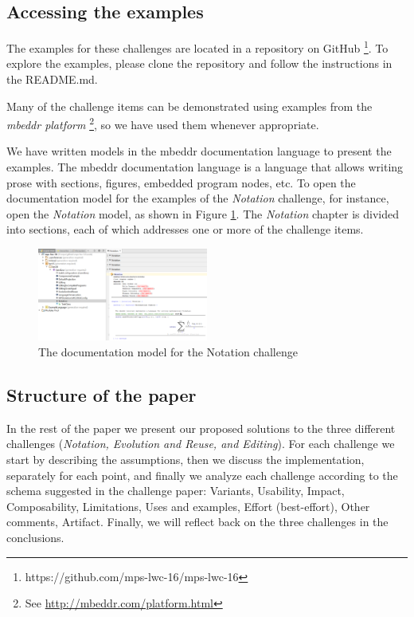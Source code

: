 \documentclass[preprint,numbers,10pt]{sigplanconf}
\begin{document}
\subsection{Accessing the examples}
The examples for these challenges are located in a repository on GitHub
\footnote{https://github.com/mps-lwc-16/mps-lwc-16}. To explore the examples,
please clone the repository and follow the instructions in the README.md.

Many of the challenge items can be demonstrated using examples from the
\emph{mbeddr platform} \footnote{See \url{http://mbeddr.com/platform.html}},
so we have used them whenever appropriate.

We have written models in the mbeddr documentation language
to present the examples. The mbeddr documentation language is a language that allows
writing prose with sections, figures, embedded program nodes, etc.
To open the documentation model for the examples of the \emph{Notation} challenge, for instance,
open the \emph{Notation} model, as shown in Figure \ref{fig:opennotation}. The \emph{Notation} chapter is
divided into sections, each of which addresses one or more of the challenge
items.

\begin{figure}[H]
	\centering
	\includegraphics[width=0.50\textwidth]{screens/OpenNotation.png}
	\caption{The documentation model for the Notation challenge}
	\label{fig:opennotation}
\end{figure}

\subsection{Structure of the paper}

In the rest of the paper we present our proposed solutions to the
three different challenges (\emph{Notation, Evolution and Reuse, and Editing}).
For each challenge we start by describing the assumptions, then we
discuss the implementation, separately for each point, and finally we
analyze each challenge according to the schema suggested in the challenge
paper\cite{erdweg2015evaluating}:
Variants, Usability, Impact, Composability, Limitations, Uses and examples, Effort (best-effort), Other
comments, Artifact.
Finally, we will reflect back on the three challenges in the conclusions.
\end{document}
